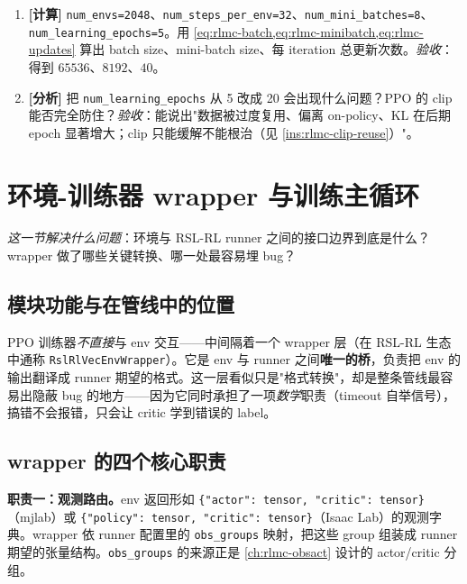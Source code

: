 \begin{practice}[数据流计算与分析]
\begin{enumerate}
  \item \textbf{[计算]} \verb|num_envs=2048|、\verb|num_steps_per_env=32|、\verb|num_mini_batches=8|、\verb|num_learning_epochs=5|。用 \cref{eq:rlmc-batch,eq:rlmc-minibatch,eq:rlmc-updates} 算出 batch size、mini-batch size、每 iteration 总更新次数。\emph{验收}：得到 $65536$、$8192$、$40$。
  \item \textbf{[分析]} 把 \verb|num_learning_epochs| 从 5 改成 20 会出现什么问题？PPO 的 clip 能否完全防住？\emph{验收}：能说出"数据被过度复用、偏离 on-policy、KL 在后期 epoch 显著增大；clip 只能缓解不能根治（见 \cref{ins:rlmc-clip-reuse}）"。
\end{enumerate}
\end{practice}

\section{环境-训练器 wrapper 与训练主循环}
\label{sec:rlmc-train-wrapper}

\emph{这一节解决什么问题}：环境与 RSL-RL runner 之间的接口边界到底是什么？wrapper 做了哪些关键转换、哪一处最容易埋 bug？

\subsection{模块功能与在管线中的位置}

PPO 训练器\emph{不直接}与 env 交互——中间隔着一个 wrapper 层（在 RSL-RL 生态中通称 \verb|RslRlVecEnvWrapper|）。它是 env 与 runner 之间\textbf{唯一的桥}，负责把 env 的输出翻译成 runner 期望的格式。这一层看似只是"格式转换"，却是整条管线最容易出隐蔽 bug 的地方——因为它同时承担了一项\emph{数学}职责（timeout 自举信号），搞错不会报错，只会让 critic 学到错误的 label。

\subsection{wrapper 的四个核心职责}

\textbf{职责一：观测路由。}env 返回形如 \verb|{"actor": tensor, "critic": tensor}|（mjlab）或 \verb|{"policy": tensor, "critic": tensor}|（Isaac Lab）的观测字典。wrapper 依 runner 配置里的 \verb|obs_groups| 映射，把这些 group 组装成 runner 期望的张量结构。\verb|obs_groups| 的来源正是 \cref{ch:rlmc-obsact} 设计的 actor/critic 分组。

